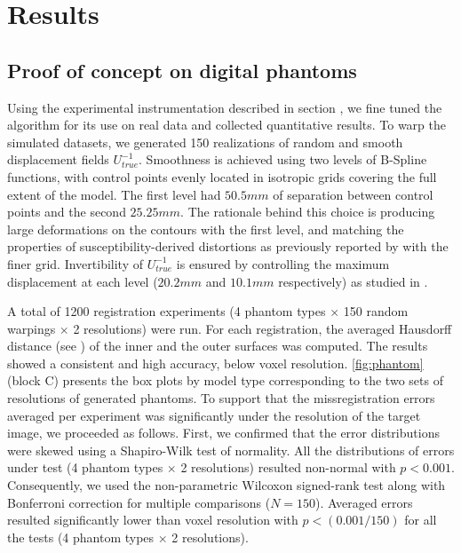 \section*{Results}
\label{sec:results}

\subsection*{Proof of concept on digital phantoms}
\label{sec:results_phantom}
Using the experimental instrumentation described in section ,
  we fine tuned the algorithm for its use on real data and collected quantitative results.
To warp the simulated datasets, we generated 150 realizations of random and smooth displacement
  fields $U^{-1}_{true}$.
Smoothness is achieved using two levels of B-Spline functions, with control points evenly
  located in isotropic grids covering the full extent of the model.
The first level had $50.5mm$ of separation between control points and the second $25.25mm$.
The rationale behind this choice is producing large deformations on the contours with
  the first level, and matching the properties of susceptibility-derived distortions
  as previously reported by \cite{irfanoglu_susceptibility_2011} with the finer grid.
Invertibility of $U^{-1}_{true}$ is ensured by controlling the maximum displacement at each
  level ($20.2mm$ and $10.1mm$ respectively) as studied in \citep{rueckert_diffeomorphic_2006}.

A total of 1200 registration experiments (4 phantom types $\times$ 150 random warpings
  $\times$ 2 resolutions) were run.
For each registration, the averaged Hausdorff distance (see )
  of the inner and the outer surfaces was computed.
The results showed a consistent and high accuracy, below voxel resolution.
\autoref{fig:phantom} (block C) presents the box plots by model type corresponding
  to the two sets of resolutions of generated phantoms.
To support that the missregistration errors averaged per experiment was significantly
  under the resolution of the target image, we proceeded as follows.
First, we confirmed that the error distributions were skewed using a Shapiro-Wilk test of
  normality.
All the distributions of errors under test (4 phantom types $\times$ 2 resolutions) resulted
  non-normal with $p<0.001$.
Consequently, we used the non-parametric Wilcoxon signed-rank test along with Bonferroni
  correction for multiple comparisons ($N=150$).
Averaged errors resulted significantly lower than voxel resolution with $p < (0.001 / 150)$
  for all the tests (4 phantom types $\times$ 2 resolutions).

